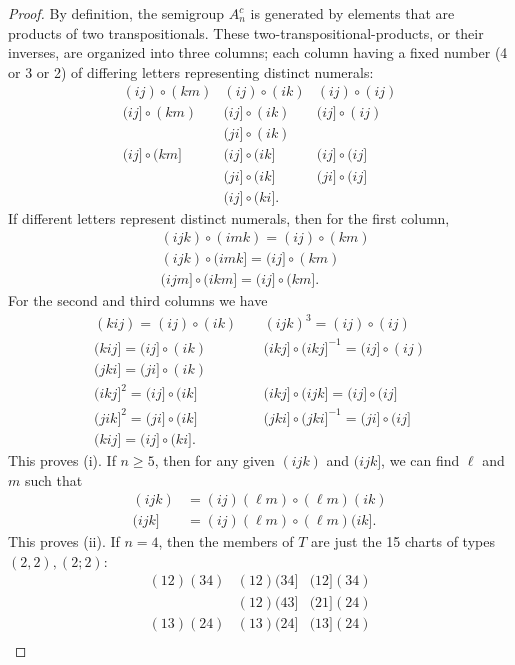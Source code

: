 \documentclass{surv-l}
\numberwithin{equation}{section}
\numberwithin{table}{section}
\numberwithin{figure}{section}
\theoremstyle{definition}
\begin{document}
\begin{proof} By definition, the semigroup $A_{n}^{c}$ is generated by
elements that are products of two transpositionals. These
two-transpositional-products, or their inverses, are organized
into three columns; each column having a fixed number (4 or 3 or
2) of differing letters representing distinct numerals:
\[
\begin{matrix}
(ij)\circ(km) &(ij)\circ (ik) &(ij)\circ(ij) \\
(ij]\circ(km) &(ij]\circ (ik) &(ij]\circ (ij) \\
&(ji]\circ(ik) & \\
(ij]\circ (km] &(ij]\circ(ik] &(ij]\circ (ij] \\
&(ji]\circ(ik] &(ji]\circ(ij] \\
&(ij]\circ(ki].&
\end{matrix}
\]
If different letters represent distinct numerals, then for the
first column,
\begin{align*}
&(ijk)\circ (imk)=(ij)\circ (km) \\
&(ijk)\circ (imk]=(ij] \circ (km) \\
&(ijm]\circ(ikm]=(ij]\circ (km].
\end{align*}
For the second and third columns we have
\[
\begin{array}{rlr}
(kij)=(ij)\circ(ik)\phantom{.} &&(ijk)^{3}=(ij)\circ(ij) \\
(kij]=(ij]\circ(ik)\phantom{.} &&(ikj]\circ (ikj]^{-1}=(ij]\circ(ij) \\
(jki]=(ji]\circ(ik)\phantom{.} &&  \\
(ikj]^{2}=(ij]\circ(ik]\phantom{.} &&(ikj]\circ (ijk]=(ij]\circ(ij] \\
(jik]^{2}=(ji]\circ (ik]\phantom{.} &&(jki]\circ(jki]^{-1}=(ji]\circ (ij] \\
(kij]=(ij]\circ(ki]. &&
\end{array}
\]
This proves (i). If $n \geq 5$, then for any given $(ijk)$ and
$(ijk]$, we can find $\ell$ and $m$ such that
\begin{align*}
(ijk)&=(ij)(\ell m)\circ (\ell m)(ik) \\
(ijk] &=(ij)(\ell m)\circ (\ell m)(ik].
\end{align*}
This proves (ii). If $n =4$, then the members of $T$ are just the
15 charts of types $(2,2),(2;2)$:
\[
\begin{matrix}
(12)(34) &(12)(34] &(12](34) \\
&(12)(43] &(21](24)\\
(13)(24) &(13)(24] &(13](24) \\

\end{matrix}\]
\end{proof}
\end{document}
